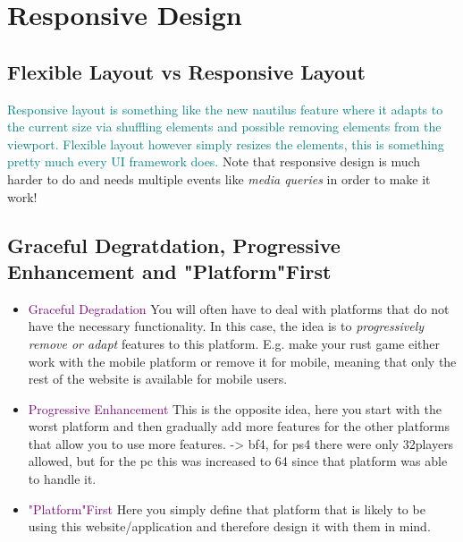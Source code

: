 \documentclass[main.tex,fontsize=8pt,paper=a4,paper=portrait,DIV=calc,]{scrartcl}
\begin{document}
\section{Responsive Design}
\subsection{Flexible Layout vs Responsive Layout}
\textcolor{teal}{Responsive layout is something like the new nautilus feature where it adapts to the current size via shuffling elements and possible removing elements from the viewport.\newline
Flexible layout however simply resizes the elements, this is something pretty much every UI framework does.}\newline
Note that responsive design is much harder to do and needs multiple events like \emph{media queries} in order to make it work!
\subsection{Graceful Degratdation, Progressive Enhancement and "Platform"First}
\begin{itemize}
\item \textcolor{purple}{Graceful Degradation}\newline
  You will often have to deal with platforms that do not have the necessary functionality.\newline
  In this case, the idea is to \emph{progressively remove or adapt} features to this platform.\newline
  E.g. make your rust game either work with the mobile platform or remove it for mobile, meaning that only the rest of the website is available for mobile users.
\item \textcolor{purple}{Progressive Enhancement}\newline
This is the opposite idea, here you start with the worst platform and then gradually add more features for the other platforms that allow you to use more features.\newline
-> bf4, for ps4 there were only 32players allowed, but for the pc this was increased to 64 since that platform was able to handle it.
\item \textcolor{purple}{"Platform"First}\newline
  Here you simply define that platform that is likely to be using this website/application and therefore design it with them in mind.
\end{itemize} 
\end{document}
